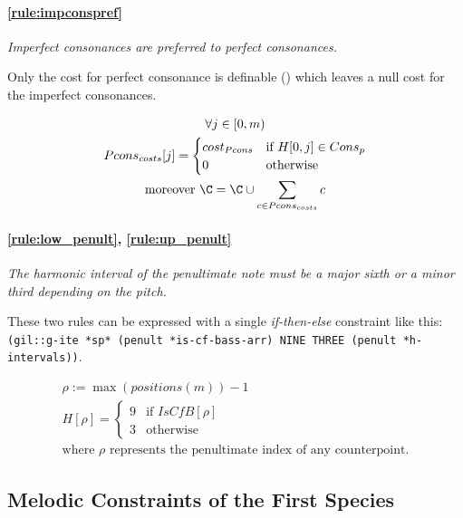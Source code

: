 \paragraph{\ref{rule:impconspref}} \textit{Imperfect consonances are preferred to perfect consonances.}

Only the cost for perfect consonance is definable () which leaves a null cost for the imperfect consonances.

\begin{equation}
    \begin{gathered}
        \forall j \in [0, m)\\
        Pcons_{costs}[j] = \begin{cases}
            cost_{Pcons} & \text{if } H[0, j] \in Cons_{p}\\
            0 & \text{otherwise}
        \end{cases}\\
        \text{moreover } \C = \C \cup \sum _{c \in Pcons_{costs}} c
    \end{gathered}
\end{equation}

\paragraph{\ref{rule:low_penult}, \ref{rule:up_penult}} \textit{The harmonic interval of the penultimate note must be a major sixth or a minor third depending on the \cf pitch.}

These two rules can be expressed with a single \textit{if-then-else} constraint like this: {\small\texttt{(gil::g-ite *sp* (penult *is-cf-bass-arr) NINE THREE (penult *h-intervals))}}.

\begin{equation}
    \begin{gathered}
        \rho := \max (positions(m)) - 1\\
        H[\rho] = \begin{cases}
            9 & \text{if } IsCfB[\rho]\\
            3 & \text{otherwise}
        \end{cases}\\
        \text{where } \rho \text{ represents the penultimate index of any counterpoint.}
    \end{gathered}
\end{equation}

\subsection{Melodic Constraints of the First Species}


